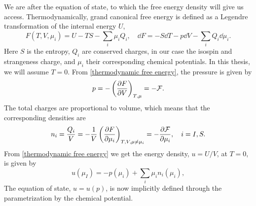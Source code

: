 We are after the equation of state, to which the free energy density will give us access.
Thermodynamically, grand canonical free energy is defined as a Legendre transformation of the internal energy $U$,
%
\begin{equation}
    \label{thermodynamic free energy}
    F(T, V, \mu_i) = U - TS - {\sum}_i \mu_i Q_i, 
    \quad \dd 
    F = - S \dd T - p \dd V - {\sum}_i Q_i \dd \mu_i.
\end{equation}
%
Here $S$ is the entropy, $Q_i$ are conserved charges, in our case the isospin and strangeness charge, and $\mu_i$ their corresponding chemical potentials.
In this thesis, we will assume $T = 0$.
From \autoref{thermodynamic free energy}, the pressure is given by
%
\begin{equation}
    \label{pressure form free energy}
    p = - \left(\pdv{F}{V}\right)_{T, \mu} = - \mathcal{F}.
\end{equation}
%
The total charges are proportional to volume, which means that the corresponding densities are
%
\begin{equation}
    n_i = \frac{Q_i}{V} = - \frac{1}{V} \left(\pdv{F}{\mu_i}\right)_{T, V,\mu\neq\mu_i}
    = - \pdv{\mathcal{F}}{\mu_i}, \quad i = I, S.
\end{equation}
%
From \autoref{thermodynamic free energy} we get the energy density, $u = U/V$, at $T = 0$, is given by
%
\begin{equation}
    \label{energy density form pressure and isospin}
    u(\mu_I) = -p(\mu_i) + {\sum }_i\mu_i n_i(\mu_i),
\end{equation}
%
The equation of state, $u = u(p)$, is now implicitly defined through the parametrization by the chemical potential.

